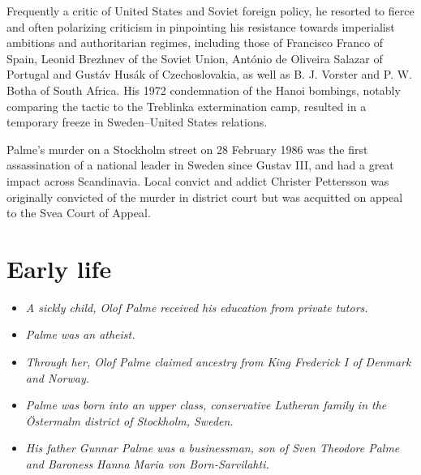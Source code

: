 Frequently a critic of United States and Soviet foreign policy, he
resorted to fierce and often polarizing criticism in pinpointing his
resistance towards imperialist ambitions and authoritarian regimes,
including those of Francisco Franco of Spain, Leonid Brezhnev of the
Soviet Union, António de Oliveira Salazar of Portugal and Gustáv Husák
of Czechoslovakia, as well as B. J. Vorster and P. W. Botha of South
Africa. His 1972 condemnation of the Hanoi bombings, notably comparing
the tactic to the Treblinka extermination camp, resulted in a temporary
freeze in Sweden--United States relations.

Palme's murder on a Stockholm street on 28 February 1986 was the first
assassination of a national leader in Sweden since Gustav III, and had a
great impact across Scandinavia. Local convict and addict Christer
Pettersson was originally convicted of the murder in district court but
was acquitted on appeal to the Svea Court of Appeal.

\section{Early life}\label{early-life}

\begin{itemize}
\item
  \emph{A sickly child, Olof Palme received his education from private
  tutors.}
\item
  \emph{Palme was an atheist.}
\item
  \emph{Through her, Olof Palme claimed ancestry from King Frederick I
  of Denmark and Norway.}
\item
  \emph{Palme was born into an upper class, conservative Lutheran family
  in the Östermalm district of Stockholm, Sweden.}
\item
  \emph{His father Gunnar Palme was a businessman, son of Sven Theodore
  Palme and Baroness Hanna Maria von Born-Sarvilahti.}
\end{itemize}

